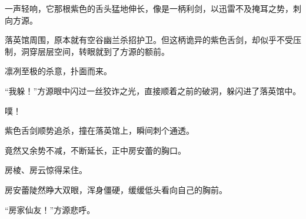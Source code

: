 \begin{this_body}
一声轻响，它那根紫色的舌头猛地伸长，像是一柄利剑，以迅雷不及掩耳之势，刺向方源。

落英馆周围，原本就有空谷幽兰杀招护卫。但这柄诡异的紫色舌剑，却似乎不受压制，洞穿层层空间，转眼就到了方源的额前。

凛冽至极的杀意，扑面而来。

“我躲！”方源眼中闪过一丝狡诈之光，直接顺着之前的破洞，躲闪进了落英馆中。

噗！

紫色舌剑顺势追杀，撞在落英馆上，瞬间刺个通透。

竟然又余势不减，不断延长，正中房安蕾的胸口。

房棱、房云惊得呆住。

房安蕾陡然睁大双眼，浑身僵硬，缓缓低头看向自己的胸前。

“房家仙友！”方源悲呼。

\end{this_body}

